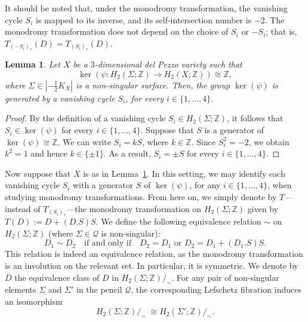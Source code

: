 \documentclass[10pt,a4paper]{article}
\numberwithin{equation}{section}
\theoremstyle{definition}
\theoremstyle{plain}
\newtheorem{lemma}[definition]{Lemma}
\theoremstyle{remark}
\newcommand{\Z}{\mathbb{Z}}
\begin{document}
It should be noted that, under the monodromy transformation, the vanishing cycle $S_i$ is mapped to its inverse, and its self-intersection number is $-2$.  The monodromy transformation does not depend on the choice of $S_i$ or $-S_i$; that is, $T_{{(-S_i)}_*}(D)=T_{(S_i)_*}(D)$. 

\begin{lemma} \label{Lemma-Vanishing.Cycle}
  Let $X$ be a $3$-dimensional del Pezzo variety such that
  $$\ker(\psi \colon H_2(\Sigma;\mathbb{Z})\to H_2(X;\mathbb{Z}))\cong \Z,$$
where $\Sigma\in |-\frac{1}{2}K_X|$ is a non-singular surface. 
Then, the group $\ker (\psi)$ is generated by a vanishing cycle $S_i$, for every $i\in \{1,\ldots,4\}$.
\end{lemma}

\begin{proof}
By the definition of a vanishing cycle $S_i\in H_2(\Sigma;\Z)$, it follows that $S_i\in \ker (\psi)$ for every $i\in \{1,\ldots,4\}$. Suppose that $S$ is a generator of $\ker (\psi)\cong \Z$. We can write $S_i=kS$, where $k\in \Z$. Since $S_i^2=-2$, we obtain $k^2=1$ and hence $k\in \{\pm 1\}$. As a result, $S_i=\pm S$ for every $i\in \{1,\ldots,4\}$.
\end{proof}

Now suppose  that $X$ is as in Lemma~\ref{Lemma-Vanishing.Cycle}. In this setting, we may identify each vanishing cycle $S_i$ with a generator $S$ of  $\ker(\psi)$, for any $i\in \{1,\ldots,4\}$, when studying monodromy transformations. From here on, 
we simply denote by $T$---instead of $T_{(S_i)_*}$---the monodromy transformation on $H_2(\Sigma;\Z)$ given by $T(D):=D+(D.S)S$. We define the following equivalence relation $\sim$ on $H_2(\Sigma;\Z)$ (where $\Sigma \in \mathcal{Q}$ is non-singular): 
 $$D_1\sim D_2 \quad\text{if and only if}\quad  D_2=D_1 \text{ or } D_2=D_1+(D_1.S)S.$$
 This relation is indeed an equivalence relation, as the monodromy transformation is an involution on the relevant set. In particular, it is symmetric.  
 We denote by $\overline{D}$  the equivalence class of $D$ in $H_2(\Sigma;\Z)/_\sim$.  For any pair of non-singular elements  $\Sigma$ and $\Sigma'$ in the pencil $\mathcal{Q}$, the corresponding Lefschetz fibration induces an isomorphism
$$H_2(\Sigma;\Z)/_\sim \;\cong H_2(\Sigma';\Z)/_\sim .$$
\end{document}
